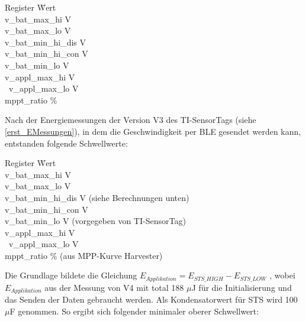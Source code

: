 \begin{minipage}{\textwidth}
    \begin{tabbing}
    Register \quad\= Wert \\[0.8ex]
    v\_bat\_max\_hi        V \\
    v\_bat\_max\_lo        V \\
    v\_bat\_min\_hi\_dis   V \\
    v\_bat\_min\_hi\_con   V \\
    v\_bat\_min\_lo        V \\
    v\_appl\_max\_hi       V \\\
    v\_appl\_max\_lo       V \\ 
    mppt\_ratio            \thinspace\% \\
    \end{tabbing}
\end{minipage}

Nach der Energiemessungen der Version V3 des TI-SensorTags (siehe \ref{erst_EMessungen}), in dem die Geschwindigkeit per BLE gesendet werden kann, entstanden folgende Schwellwerte:

\begin{minipage}{\textwidth}
    \begin{tabbing}
    Register \quad\= Wert \\[0.8ex]
    v\_bat\_max\_hi        V \\
    v\_bat\_max\_lo        V \\
    v\_bat\_min\_hi\_dis   V (siehe Berechnungen unten)\\
    v\_bat\_min\_hi\_con   V \\
    v\_bat\_min\_lo        V (vorgegeben von TI-SensorTag)\\
    v\_appl\_max\_hi      \> 3.8 V \\\
    v\_appl\_max\_lo       V \\ 
    mppt\_ratio            \> 50\thinspace\% (aus MPP-Kurve Harvester)\\
    \end{tabbing}
\end{minipage}

Die Grundlage bildete die Gleichung  $E_{Applikation}= E_{STS\_HIGH} - E_{STS\_LOW}$ , wobei  $E_{Applikation}$ aus der Messung von V4 mit total 188 $\mu$J für die Initialisierung und das Senden der Daten gebraucht werden. Als Kondensatorwert für STS wird 100 $\mu$F genommen. So ergibt sich folgender minimaler oberer Schwellwert:

